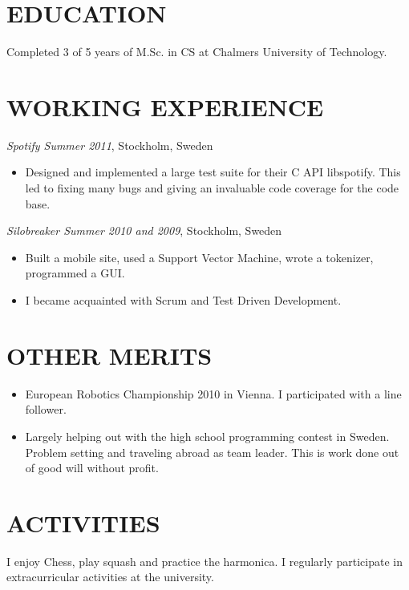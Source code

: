 \documentclass[11pt]{res} %
\begin{document}
\begin{resume}
\section{EDUCATION} 
 \noindent Completed 3 of 5 years of M.Sc. in CS
  at Chalmers University of Technology.
 
\section{WORKING EXPERIENCE}
\emph{Spotify Summer 2011}, Stockholm, Sweden
\vspace{0.2in}
   \begin{itemize} %
   \item Designed and implemented a large test 
    suite for their C API libspotify.
    This led to fixing many bugs and giving an 
    invaluable code coverage for the code base.
 \end{itemize}


\emph{Silobreaker Summer 2010 and 2009}, Stockholm, Sweden
\vspace{0.2in}
 \begin{itemize} %
  \item Built a mobile site, used a Support Vector Machine, wrote a tokenizer,
   programmed a GUI.
  \item I became acquainted with Scrum and Test Driven Development.
\end{itemize} 

\section{OTHER MERITS}

   \begin{itemize} %
   \item European Robotics Championship 2010 in Vienna.
    I participated with a line follower.
   \item Largely helping out with the high school programming contest in Sweden.
    Problem setting and traveling abroad as team leader.
    This is work done out of good will without profit.
 \end{itemize}

\section{ACTIVITIES} 
 
I enjoy Chess, play squash and practice the harmonica.
I regularly participate in extracurricular
activities at the university.
 

\end{resume}
\end{document}

